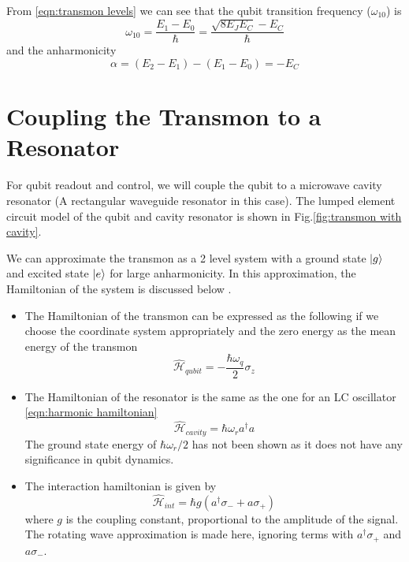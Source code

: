 From \ref{eqn:transmon levels} we can see that the qubit transition frequency ($\omega_{10}$) is
\begin{equation}
\omega_{10}=\frac{E_1-E_0}{\hbar}=\frac{\sqrt{8E_JE_C}-E_C}{\hbar}
\end{equation}
and the anharmonicity
\begin{equation}
\alpha=(E_2-E_1)-(E_1-E_0)=-E_C
\end{equation}

\section{Coupling the Transmon to a Resonator}

For qubit readout and control, we will couple the qubit to a microwave cavity resonator (A rectangular waveguide resonator in this case). The lumped element circuit model of the qubit and cavity resonator is shown in Fig.\ref{fig:transmon with cavity}.

We can approximate the transmon as a 2 level system with a ground state $\ket{g}$ and excited state $\ket{e}$ for large anharmonicity. In this approximation, the Hamiltonian of the system is discussed below  \cite{Richer2013,Schuster2007}.
\begin{itemize}
\item The Hamiltonian of the transmon can be expressed as the following if we choose the coordinate system appropriately and the zero energy as the mean energy of the transmon
\begin{equation}
\hat{\mathcal{H}}_{qubit}=-\frac{\hbar\omega_q}{2}\sigma_z
\label{eqn:qubit free hamiltonian}
\end{equation}
\item The Hamiltonian of the resonator is the same as the one for  an LC oscillator \ref{eqn:harmonic hamiltonian}
\begin{equation}
\hat{\mathcal{H}}_{cavity}=\hbar\omega_ra^\dag a
\end{equation}
The ground state energy of $\hbar\omega_r/2$ has not been shown as it does not have any significance in qubit dynamics.
\item The interaction hamiltonian is given by 
\begin{equation}
\hat{\mathcal{H}}_{int}=\hbar g(a^\dag\sigma_-+a\sigma_+)
\end{equation}
where $g$ is the coupling constant, proportional to the amplitude of the signal. The rotating wave approximation is made here, ignoring terms with $a^\dag\sigma_+$ and $a\sigma_-$.
\end{itemize}

